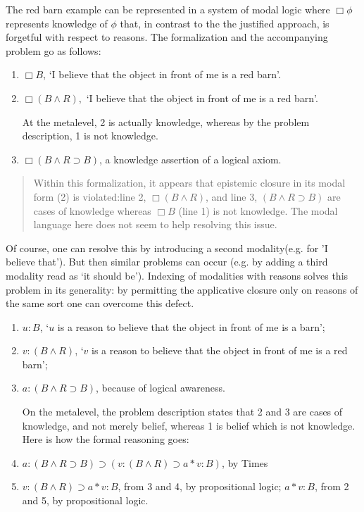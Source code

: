 The red barn example can be represented in a system of modal logic where $\Box \phi$ represents knowledge of $\phi$ that, in contrast to the the justified approach, is forgetful with respect to reasons. The formalization and the accompanying problem go as follows:

\begin{enumerate}
    \item $\Box B$, ‘I believe that the object in front of me is a red barn’.
    \item  $\Box(B \wedge R),$ ‘I believe that the object in front of me is a red barn’. 

At the metalevel, 2 is actually knowledge, whereas by the problem description, 1 is not knowledge.

   \item $\Box(B\wedge R\supset B)$, a knowledge assertion of a logical axiom.
	\end{enumerate}
\begin{quote}	
Within this formalization, it appears that epistemic closure in its modal form (2) is violated:line 2, $\Box(B \wedge R )$, and line 3, $(B \wedge R \supset B)$ are cases of knowledge whereas $\Box B$ (line 1) is not knowledge. The modal language here does not seem to help resolving this issue.
\end{quote}
Of course, one can resolve this by introducing a second modality(e.g. for 'I believe that'). But then similar problems can occur (e.g. by adding a third modality read as `it should be'). Indexing of modalities with reasons solves this problem in its generality: by permitting the applicative closure only on reasons of the same sort one can overcome this defect.
\begin{enumerate}
   \item $u:B$, ‘$u$ is a reason to believe that the object in front of me is a barn’;
   \item $v:(B \wedge R)$, ‘$v$ is a reason to believe that the object in front of me is a red barn’;
    \item $a:(B \wedge R \supset B)$, because of logical awareness.


 On the metalevel, the problem description states that 2 and 3 are cases of knowledge, and not merely belief, whereas 1 is belief which is not knowledge. Here is how the formal reasoning goes:

    \item $a:(B \wedge R \supset B)\supset(v:(B \wedge R) \supset  a*v:B)$, by {\sf Times} 
    \item $v:(B \wedge R) \supset a*v:B$, from 3 and 4, by propositional logic;
    $a*v:B$, from 2 and 5, by propositional logic.

\end{enumerate}
